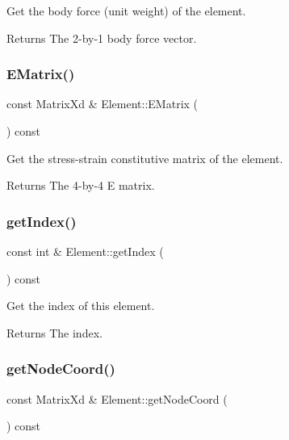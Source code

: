 Get the body force (unit weight) of the element. 

\begin{DoxyReturn}{Returns}
The 2-\/by-\/1 body force vector. 
\end{DoxyReturn}
\mbox{\label{class_element_abd9d11d211f4f5e6f9e213a1013f36ed}} 
\subsubsection{\texorpdfstring{E\+Matrix()}{EMatrix()}}
{\footnotesize\ttfamily const Matrix\+Xd \& Element\+::\+E\+Matrix (\begin{DoxyParamCaption}{ }\end{DoxyParamCaption}) const}



Get the stress-\/strain constitutive matrix of the element. 

\begin{DoxyReturn}{Returns}
The 4-\/by-\/4 E matrix. 
\end{DoxyReturn}
\mbox{\label{class_element_a85dc312253f1d39c29659393fbb1d485}} 
\subsubsection{\texorpdfstring{get\+Index()}{getIndex()}}
{\footnotesize\ttfamily const int \& Element\+::get\+Index (\begin{DoxyParamCaption}{ }\end{DoxyParamCaption}) const}



Get the index of this element. 

\begin{DoxyReturn}{Returns}
The index. 
\end{DoxyReturn}
\mbox{\label{class_element_a4d12b24e62592a1456e04d15872d5240}} 
\subsubsection{\texorpdfstring{get\+Node\+Coord()}{getNodeCoord()}}
{\footnotesize\ttfamily const Matrix\+Xd \& Element\+::get\+Node\+Coord (\begin{DoxyParamCaption}{ }\end{DoxyParamCaption}) const}



